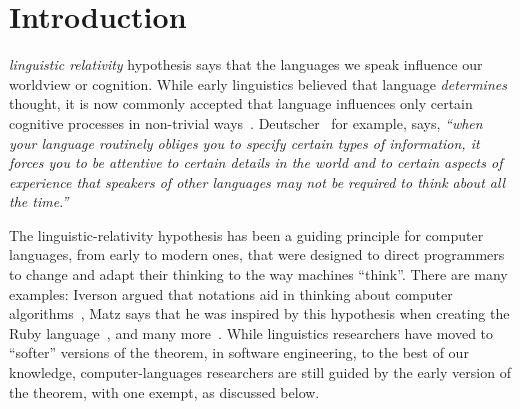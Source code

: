 \documentclass[10pt,journal,compsoc]{IEEEtran}
\theoremstyle{definition}
\begin{document}
%
\IEEEpeerreviewmaketitle

\ifCLASSOPTIONcompsoc
{}
\else
\section{Introduction}
\label{sec:Introduction}
\fi
 \textit{linguistic relativity} hypothesis says that the languages we speak influence our worldview or cognition. While early linguistics believed that language \textit{determines} thought, it is now commonly accepted that language influences only certain cognitive processes in non-trivial ways~\cite{pae2020linguistic}. Deutscher~\cite{deutscher2010through} for example, says, \emph{``when your language routinely obliges you to specify certain types of information, it forces you to be attentive to certain details in the world and to certain aspects of experience that speakers of other languages may not be required to think about all the time.''}

The linguistic-relativity hypothesis has been a guiding principle for computer languages, from early to modern ones, that were designed to direct programmers to change and adapt their thinking to the way machines ``think''. There are many examples: Iverson argued that notations aid in thinking about computer algorithms~\cite{iverson2007notation}, Matz says that he was inspired by this hypothesis when creating the Ruby language~\cite{Matz2003Ruby}, and many more~\cite{moyne1975relevance, chen2018linguistic}. While linguistics researchers have moved to ``softer'' versions of the theorem, in software engineering, to the best of our knowledge, computer-languages researchers are still guided by the early version of the theorem, with one exempt, as discussed below. 
\end{document}
